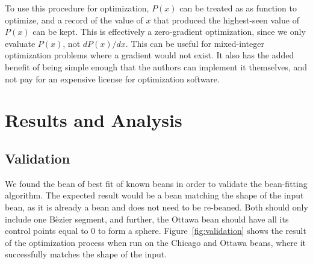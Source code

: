 \documentclass[%
reprint,
twocolumn,
nofootinbib,
 amsmath,amssymb,
 aps,
]{revtex4-2}
\begin{document}
To use this procedure for optimization, $P(x)$ can be treated as as function to optimize, and a record of the value of $x$ that produced the highest-seen value of $P(x)$ can be kept. This is effectively a zero-gradient optimization, since we only evaluate $P(x)$, not $dP(x)/dx$. This can be useful for mixed-integer optimization problems where a gradient would not exist. It also has the added benefit of being simple enough that the authors can implement it themselves, and not pay for an expensive license for optimization software.~\cite{gurobi}

\section{Results and Analysis}
\label{section:results}


\subsection{Validation}

We found the  bean of best fit of known beans in order to validate the bean-fitting algorithm. The expected result would be a bean matching the shape of the input bean, as it is already a bean and does not need to be re-beaned. Both should only include one B\`ezier segment, and further, the Ottawa bean should have all its control points equal to 0 to form a sphere. Figure~\ref{fig:validation} shows the result of the optimization process when run on the Chicago and Ottawa beans, where it successfully matches the shape of the input.
\end{document}
